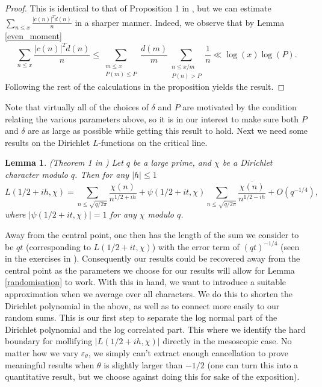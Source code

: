 \documentclass[reqno]{amsart}
\newtheorem{lemma}{Lemma}
\theoremstyle{definition}
\theoremstyle{remark}
\numberwithin{equation}{section}
\theoremstyle{remark}
\begin{document}
\begin{proof}
This is identical to that of Proposition 1 in \cite{harper2023typicalsizecharacterzeta}, but we can estimate $\sum_{n \leq x}\frac{|c(n)|^2\tilde{d}(n)}{n}$ in a sharper manner. Indeed, we observe that by Lemma \ref{even_moment}
$$\sum_{n \leq x}\frac{|c(n)|^2\tilde{d}(n)}{n} \leq \sum_{\substack{m \leq x \\ P(m) \leq P}}\frac{d(m)}{m}\sum_{\substack{n \leq x/m \\ P(n) > P}}\frac{1}{n} \ll \log(x)\log(P).$$
Following the rest of the calculations in the proposition yields the result.
\end{proof}
Note that virtually all of the choices of $\delta$ and $P$ are motivated by the condition relating the various parameters above, so it is in our interest to make sure both $P$ and $\delta$ are as large as possible while getting this result to hold. Next we need some results on the Dirichlet $L$-functions on the critical line.
\begin{lemma}
    (Theorem 1 in \cite{davies1965}) Let $q$ be a large prime, and $\chi$ be a Dirichlet character modulo $q$. Then for any $|h| \leq 1$
    $$L(1/2+ih,\chi) = \sum_{n \leq \sqrt{q/2\pi}}\frac{\chi(n)}{n^{1/2+ih}} + \psi(1/2+it,\chi)\sum_{n \leq \sqrt{q/2\pi}}\frac{\overline{\chi(n)}}{n^{1/2-ih}} + O(q^{-1/4}),$$
    where $|\psi(1/2+it,\chi)|=1$ for any $\chi$ modulo $q$.
\label{Dirichlet_AFE}
\end{lemma}
Away from the central point, one then has the length of the sum we consider to be $qt$ (corresponding to $L(1/2+it,\chi)$) with the error term of $(qt)^{-1/4}$ (seen in the exercises in \cite{koukoulopoulos2019distribution}). Consequently our results could be recovered away from the central point as the parameters we choose for our results will allow for Lemma \ref{randomisation} to work. With this in hand, we want to introduce a suitable approximation when we average over all characters. We do this to shorten the Dirichlet polynomial in the above, as well as to connect more easily to our random sums. This is our first step to separate the log normal part of the Dirichlet polynomial and the log correlated part. This where we identify the hard boundary for mollifying $|L(1/2+ih,\chi)|$ directly in the mesoscopic case. No matter how we vary $\varepsilon_\theta$, we simply can't extract enough cancellation to prove meaningful results when $\theta$ is slightly larger than $-1/2$ (one can turn this into a quantitative result, but we choose against doing this for sake of the exposition).
\end{document}
